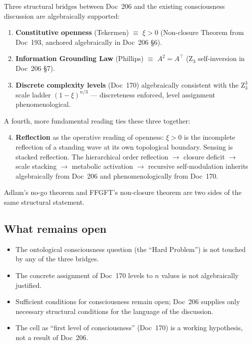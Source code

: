 \begin{conclusionBox}
Three structural bridges between Doc~206 and the existing consciousness discussion are algebraically supported:

\begin{enumerate}
\item \textbf{Constitutive openness} (Tekermen) $\equiv$ $\xi > 0$ (Non-closure Theorem from Doc~193, anchored algebraically in Doc~206 \S6).
\item \textbf{Information Grounding Law} (Phillips) $\equiv$ $A^2 = A^\top$ (Z$_3$ self-inversion in Doc~206 \S7).
\item \textbf{Discrete complexity levels} (Doc~170) algebraically consistent with the Z$_3^3$ scale ladder $(1-\xi)^{n/3}$ --- discreteness enforced, level assignment phenomenological.
\end{enumerate}

A fourth, more fundamental reading ties these three together:

\begin{enumerate}
\setcounter{enumi}{3}
\item \textbf{Reflection} as the operative reading of openness: $\xi > 0$ is the incomplete reflection of a standing wave at its own topological boundary. Sensing is stacked reflection. The hierarchical order reflection $\to$ closure deficit $\to$ scale stacking $\to$ metabolic activation $\to$ recursive self-modulation inherits algebraically from Doc~206 and phenomenologically from Doc~170.
\end{enumerate}

Adlam's no-go theorem and FFGFT's non-closure theorem are two sides of the same structural statement.
\end{conclusionBox}

\subsection{What remains open}

\begin{itemize}
\item The ontological consciousness question (the ``Hard Problem'') is not touched by any of the three bridges.
\item The concrete assignment of Doc~170 levels to $n$ values is not algebraically justified.
\item Sufficient conditions for consciousness remain open; Doc~206 supplies only necessary structural conditions for the language of the discussion.
\item The cell as ``first level of consciousness'' (Doc~170) is a working hypothesis, not a result of Doc~206.
\end{itemize}

